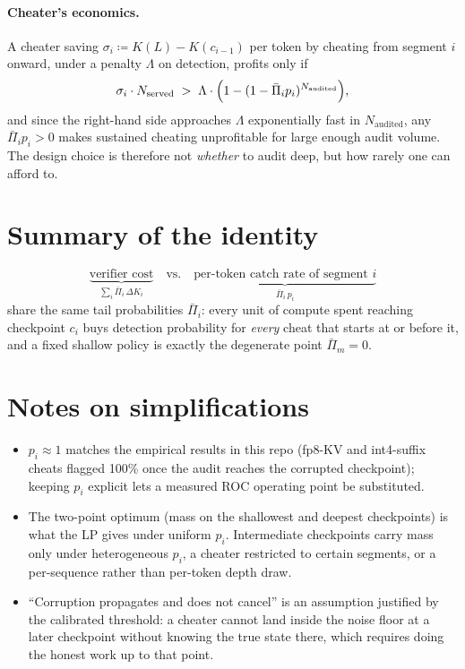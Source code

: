 \documentclass[11pt]{article}
\begin{document}
\paragraph{Cheater's economics.}
A cheater saving $\sigma_i \coloneqq K(L)-K(c_{i-1})$ per token by cheating from segment $i$
onward, under a penalty $\Lambda$ on detection, profits only if
\[
  \sigma_i \cdot N_{\text{served}} \;>\; \Lambda\cdot\Bigl(1-(1-\bar\Pi_i p_i)^{N_{\text{audited}}}\Bigr),
\]
and since the right-hand side approaches $\Lambda$ exponentially fast in $N_{\text{audited}}$,
any $\bar\Pi_i p_i>0$ makes sustained cheating unprofitable for large enough audit volume.
The design choice is therefore not \emph{whether} to audit deep, but how rarely one can
afford to.

\section{Summary of the identity}
\[
  \underbrace{\text{verifier cost}}_{\sum_i \bar\Pi_i\,\Delta K_i}
  \quad\text{vs.}\quad
  \underbrace{\text{per-token catch rate of segment } i}_{\bar\Pi_i\,p_i}
\]
share the same tail probabilities $\bar\Pi_i$: every unit of compute spent reaching
checkpoint $c_i$ buys detection probability for \emph{every} cheat that starts at or before
it, and a fixed shallow policy is exactly the degenerate point $\bar\Pi_m = 0$.

\section*{Notes on simplifications}
\begin{itemize}
  \item $p_i\approx 1$ matches the empirical results in this repo (fp8-KV and int4-suffix
        cheats flagged 100\% once the audit reaches the corrupted checkpoint); keeping
        $p_i$ explicit lets a measured ROC operating point be substituted.
  \item The two-point optimum (mass on the shallowest and deepest checkpoints) is what the
        LP gives under uniform $p_i$. Intermediate checkpoints carry mass only under
        heterogeneous $p_i$, a cheater restricted to certain segments, or a per-sequence
        rather than per-token depth draw.
  \item ``Corruption propagates and does not cancel'' is an assumption justified by the
        calibrated threshold: a cheater cannot land inside the noise floor at a later
        checkpoint without knowing the true state there, which requires doing the honest
        work up to that point.
\end{itemize}
\end{document}
